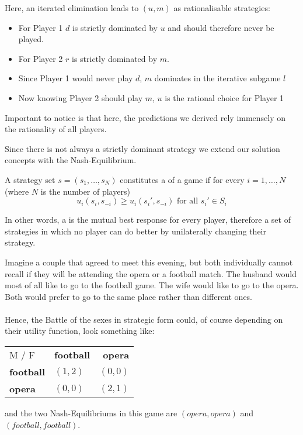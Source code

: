 Here, an iterated elimination leads to $(u, m)$ as rationalisable strategies:
\begin{itemize}
	\item For Player 1 $d$ is strictly dominated by $u$ and should therefore never be played.
	\item For Player 2 $r$ is strictly dominated by $m$.
	\item Since Player 1 would never play $d$, $m$ dominates in the iterative subgame $l$
	\item Now knowing Player 2 should play $m$, $u$ is the rational choice for Player 1
\end{itemize} 	

Important to notice is that here, the predictions we derived rely immensely on the rationality of all players.

Since there is not always a strictly dominant strategy we extend our solution concepts with the Nash-Equilibrium.

\begin{definition} \label{nashequilibrium} 
A strategy set $s = (s_{1}, \dotsc, s_{N})$ constitutes a  of a game if for every $i = 1, \dotsc, N$ (where $N$ is the number of players)
	\[ u_{i}(s_{i}, s_{-i}) \geq u_{i}(s_{i}', s_{-i}) \text{ for all } s_{i}' \in S_{i} \]
\end{definition}

In other words, a  is the mutual best response for every player, therefore a set of strategies in which no player can do better by unilaterally changing their strategy. \\

\begin{example} \label{battleofthesexes} 
		Imagine a couple that agreed to meet this evening, but both individually cannot recall if they will be attending the opera or a football match. The husband would most of all like to go to the football game. The wife would like to go to the opera. Both would prefer to go to the same place rather than different ones. \\ \\
		Hence, the Battle of the sexes in strategic form could, of course depending on their utility function, look something like:
		\begin{center}
			\begin{tabular}{|l|l|r|}
				\hline\hline
  					M / F & \textbf{football} & \textbf{opera} \\
         				\cline{1-3}
   					\textbf{football} & $(1, 2)$ & $(0, 0)$ 	\arrayrulewidth2pt \\
            			\cline{1-3}
   					\textbf{opera} & $(0, 0)$ & $(2, 1)$ \\ \hline\hline
			\end{tabular}	
		\end{center}
		
		and the two Nash-Equilibriums in this game are $(opera, opera)$ and $(football, football)$.
\end{example}

